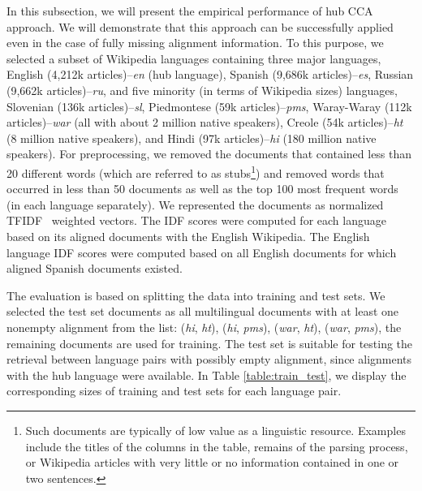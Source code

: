 In this subsection, we will present the empirical performance of hub CCA approach. 
We will demonstrate that this approach can be successfully applied even in the case of 
fully missing alignment information.
To this purpose, we selected a subset of Wikipedia languages containing three major languages, 
English (4,212k articles)--\emph{en} (hub language), Spanish (9,686k articles)--\emph{es}, 
Russian (9,662k articles)--\emph{ru}, and five minority (in terms of Wikipedia sizes) languages, 
Slovenian (136k articles)--\emph{sl}, Piedmontese (59k articles)--\emph{pms}, 
Waray-Waray (112k articles)--\emph{war} (all with about 2 million native speakers), 
Creole (54k articles)--\emph{ht} (8 million native speakers), and Hindi 
(97k articles)--\emph{hi} (180 million native speakers). For preprocessing, we removed the documents that contained 
less than 20 different words (which are referred to as stubs\footnote{Such documents are typically of low value as a linguistic resource. 
Examples include the titles of the columns in the table, remains of the parsing process, 
or Wikipedia articles with very little or no information contained in one or two sentences.}) and removed words that occurred in 
less than 50 documents as well as the top 100 most frequent words (in each language separately). We represented the documents as 
normalized TFIDF~\cite{Salton88term-weightingapproaches} weighted vectors. The IDF scores were computed for each language based 
on its aligned documents with the English Wikipedia. The English language IDF scores were computed based on all English documents 
for which aligned Spanish documents existed.

The evaluation is based on splitting the data into training and test sets.
We selected the test set documents as all multilingual documents with at least one nonempty alignment 
from the list: (\emph{hi}, \emph{ht}), (\emph{hi}, \emph{pms}), (\emph{war}, \emph{ht}), (\emph{war}, \emph{pms}),
the remaining documents are used for training.
The test set is suitable for testing the retrieval between language pairs with possibly empty alignment, since alignments with the hub
language were available. 
In Table \ref{table:train_test}, we display the corresponding sizes of training and test sets for each language pair.

